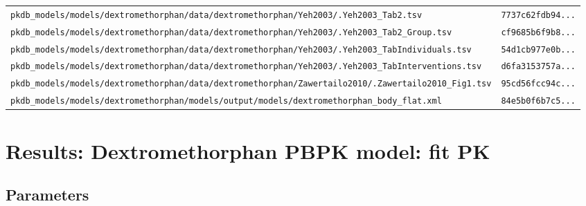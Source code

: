 \documentclass{article}
\begin{document}
\begin{longtable}{ll}
\texttt{pkdb\_models/models/dextromethorphan/data/dextromethorphan/Yeh2003/.Yeh2003\_Tab2.tsv} & \texttt{7737c62fdb94...} \\
\texttt{pkdb\_models/models/dextromethorphan/data/dextromethorphan/Yeh2003/.Yeh2003\_Tab2\_Group.tsv} & \texttt{cf9685b6f9b8...} \\
\texttt{pkdb\_models/models/dextromethorphan/data/dextromethorphan/Yeh2003/.Yeh2003\_TabIndividuals.tsv} & \texttt{54d1cb977e0b...} \\
\texttt{pkdb\_models/models/dextromethorphan/data/dextromethorphan/Yeh2003/.Yeh2003\_TabInterventions.tsv} & \texttt{d6fa3153757a...} \\
\texttt{pkdb\_models/models/dextromethorphan/data/dextromethorphan/Zawertailo2010/.Zawertailo2010\_Fig1.tsv} & \texttt{95cd56fcc94c...} \\
\texttt{pkdb\_models/models/dextromethorphan/models/output/models/dextromethorphan\_body\_flat.xml} & \texttt{84e5b0f6b7c5...} \\
\end{longtable}

\section{Results: Dextromethorphan PBPK model: fit PK}

\subsection{Parameters}
\end{document}
